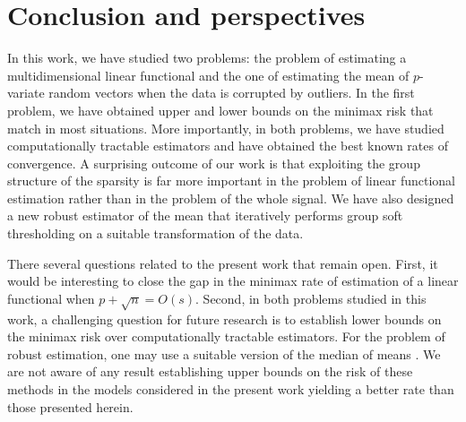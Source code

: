 \documentclass[sts,preprint,reqno,a4paper]{imsart}
\theoremstyle{plain}
\theoremstyle{remark}
\theoremstyle{definition}
\begin{document}
\section{Conclusion and perspectives}\label{section_conc}

In this work, we have studied two problems: the problem of estimating
a multidimensional linear functional and the one of estimating the mean 
of $p$-variate random vectors when the data is corrupted by outliers. 
In the first problem, we have obtained upper and lower bounds on the minimax
risk that match in most situations. More importantly, in both problems, we 
have studied computationally tractable estimators and have obtained the
best known rates of convergence. A surprising outcome of our work is that
exploiting the group structure of the sparsity is far more important in
the problem of linear functional estimation rather than in the problem
of the whole signal. We have also designed a new robust estimator of the
mean that iteratively performs group soft thresholding on a suitable
transformation of the data. 

There several questions related to the present work that remain open. 
First, it would be interesting to close the gap in the minimax rate of
estimation of a linear functional when $p+\sqrt{n}=O(s)$. Second, in both
problems studied in this work, a challenging question for future research
is to establish lower bounds on the minimax risk over computationally
tractable estimators. For the problem of robust estimation, one may use 
a suitable version of the median of means 
\citep{Oliveira,minsker2015,devroye2016,LL17}. We are not aware of any 
result establishing upper bounds on the risk of these methods in the 
models considered in the present work yielding a better rate than 
those presented herein. 
\end{document}
